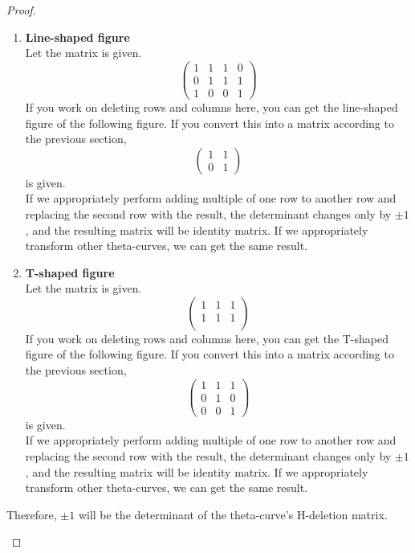 \documentclass{article}
\theoremstyle{definition}
\begin{document}
\begin{proof}
\begin{enumerate}
\begin{enumerate}[label={(\roman*)}]
    \item \textbf{Line-shaped figure}\\
    Let the matrix is given.
    $$\begin{pmatrix}
        1 & 1 & 1 & 0\\
        0 & 1 & 1 & 1\\
        1 & 0 & 0 & 1
    \end{pmatrix}$$
    If you work on deleting rows and columns here, you can get the line-shaped figure of the following figure. If you convert this into a matrix according to the previous section,
    $$\begin{pmatrix}
        1 & 1 \\
        0 & 1
    \end{pmatrix}$$
    is given.\\
    If we appropriately perform adding multiple of one row to another row and replacing the second row with the result, the determinant changes only by $\pm 1$, and the resulting matrix will be identity matrix. If we appropriately transform other theta-curves, we can get the same result.
    \item \textbf{T-shaped figure}\\
    Let the matrix is given.
    $$\begin{pmatrix}
        1 & 1 & 1\\
        1 & 1 & 1\\
    \end{pmatrix}$$
    If you work on deleting rows and columns here, you can get the T-shaped figure of the following figure. If you convert this into a matrix according to the previous section,
    $$\begin{pmatrix}
        1 & 1 & 1\\
        0 & 1 & 0\\
        0 & 0 & 1
    \end{pmatrix}$$
    is given.\\
    If we appropriately perform adding multiple of one row to another row and replacing the second row with the result, the determinant changes only by $\pm 1$, and the resulting matrix will be identity matrix. If we appropriately transform other theta-curves, we can get the same result.
\end{enumerate}
Therefore, $\pm 1$ will be the determinant of the theta-curve's H-deletion matrix.


\end{enumerate}
\end{proof}
\end{document}
